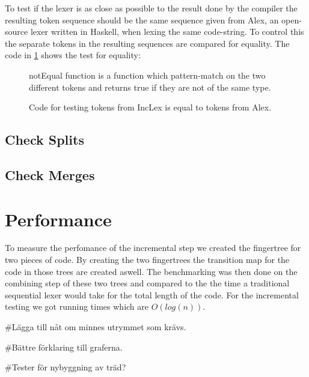 To test if the lexer is as close as possible to the result done by the compiler
the resulting token sequence should be the same sequence given from Alex, an
open-source lexer written in Haskell, when lexing the same code-string.
To control this the separate tokens in the resulting sequences are compared for
equality. 
The code in \cref{fig:CheckEquility} shows the test for equality:

\begin{figure}[h!]
  \centering
  
  notEqual function is a function which pattern-match on the two different
  tokens and returns true if they are not of the same type.
  \caption{Code for testing tokens from IncLex is equal to tokens from Alex. 
  \label{fig:CheckEquility}}
\end{figure} 

\subsection{Check Splits}

\subsection{Check Merges}

\section{Performance}
To measure the perfomance of the incremental step we created the fingertree for
two pieces of code. By creating the two fingertrees the transition map for the
code in those trees are created aswell. The benchmarking was then done on the
combining step of these two trees and compared to the the time a traditional
sequential lexer would take for the total length of the code. For the
incremental testing we got running times which are $O(log(n))$.

#Lägga till nåt om minnes utrymmet som krävs.

#Bättre förklaring till graferna.

#Tester för nybyggning av träd?

